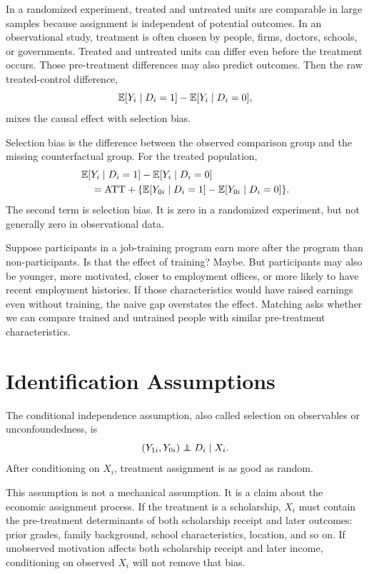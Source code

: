 In a randomized experiment, treated and untreated units are comparable in large
samples because assignment is independent of potential outcomes. In an
observational study, treatment is often chosen by people, firms, doctors,
schools, or governments. Treated and untreated units can differ even before the
treatment occurs. Those pre-treatment differences may also predict outcomes.
Then the raw treated-control difference,
\[
    \mathbb{E}[Y_i\mid D_i=1]-\mathbb{E}[Y_i\mid D_i=0],
\]
mixes the causal effect with selection bias.

\begin{defN}
Selection bias is the difference between the observed comparison group and the
missing counterfactual group. For the treated population,
\[
\begin{aligned}
    &\mathbb{E}[Y_i\mid D_i=1]-\mathbb{E}[Y_i\mid D_i=0] \\
    &\quad =
    \mathrm{ATT}
    +
    \{\mathbb{E}[Y_{0i}\mid D_i=1]
    -\mathbb{E}[Y_{0i}\mid D_i=0]\}.
\end{aligned}
\]
The second term is selection bias. It is zero in a randomized experiment, but
not generally zero in observational data.
\end{defN}

\begin{exmp}
Suppose participants in a job-training program earn more after the program than
non-participants. Is that the effect of training? Maybe. But participants may
also be younger, more motivated, closer to employment offices, or more likely
to have recent employment histories. If those characteristics would have raised
earnings even without training, the naive gap overstates the effect. Matching
asks whether we can compare trained and untrained people with similar
pre-treatment characteristics.
\end{exmp}

\section{Identification Assumptions}

\begin{assN}
The conditional independence assumption, also called selection on observables or
unconfoundedness, is
\[
    (Y_{1i},Y_{0i}) \independent D_i \mid X_i.
\]
After conditioning on \(X_i\), treatment assignment is as good as random.
\end{assN}

This assumption is not a mechanical assumption. It is a claim about the economic
assignment process. If the treatment is a scholarship, \(X_i\) must contain the
pre-treatment determinants of both scholarship receipt and later outcomes:
prior grades, family background, school characteristics, location, and so on.
If unobserved motivation affects both scholarship receipt and later income,
conditioning on observed \(X_i\) will not remove that bias.

